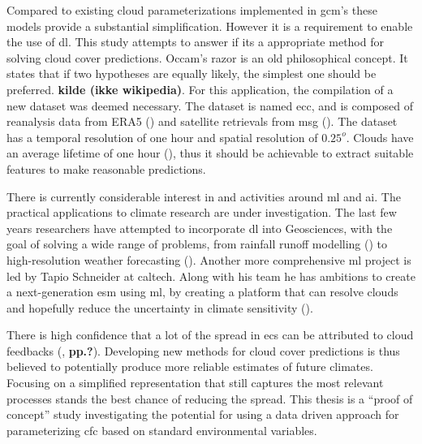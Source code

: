 Compared to existing cloud parameterizations implemented in \acrshort{gcm}'s these models provide a substantial simplification.
However it is a requirement to enable the use of \acrshort{dl}.
This study attempts to answer if its a appropriate method for solving cloud cover predictions.
Occam's razor is an old philosophical concept. It states that if two hypotheses are equally likely, the simplest one should be preferred. \textbf{kilde (ikke wikipedia)}. For this application, the compilation of a new dataset was deemed necessary. The dataset is named \acrfull{ecc}, and is composed of reanalysis data from ERA5 (\cite{ADD ERA5 citation}) and satellite retrievals from \acrfull{msg} (\cite{ADD MSG citation}).
The dataset has a temporal resolution of one hour and spatial resolution of $0.25^o$. Clouds have an average lifetime of one hour (\cite{lohmann2016}), thus it should be achievable to extract suitable features to make reasonable predictions. 

There is currently considerable interest in and activities around \acrfull{ml} and \acrshort{ai}. The practical applications to climate research are under investigation. The last few years researchers have attempted to incorporate \acrshort{dl} into Geosciences, with the goal of solving a wide range of problems, from rainfall runoff modelling (\cite{hess-23-5089-2019}) to  high-resolution weather forecasting (\cite{Rodrigues2018DeepDownscale:Forecast}). Another more comprehensive \acrshort{ml} project is led by Tapio Schneider at \acrfull{caltech}. Along with his team he has ambitions to create a next-generation \acrfull{esm} using \acrshort{ml}, by creating a platform that can resolve clouds and hopefully reduce the uncertainty in climate sensitivity (\cite{Voosen2018ScienceIntelligence}).

There is high confidence that a lot of the spread in \acrshort{ecs} can be attributed to cloud feedbacks (\cite{IPCC_CH9_climate_models},\textbf{ pp.?}). Developing new methods for cloud cover predictions is thus believed to potentially produce more reliable estimates of future climates. Focusing on a simplified representation that still captures the most relevant processes stands the best chance of reducing the spread. This thesis is a ``proof of concept'' study investigating the potential for using a data driven approach for parameterizing \acrfull{cfc} based on standard environmental variables. 


